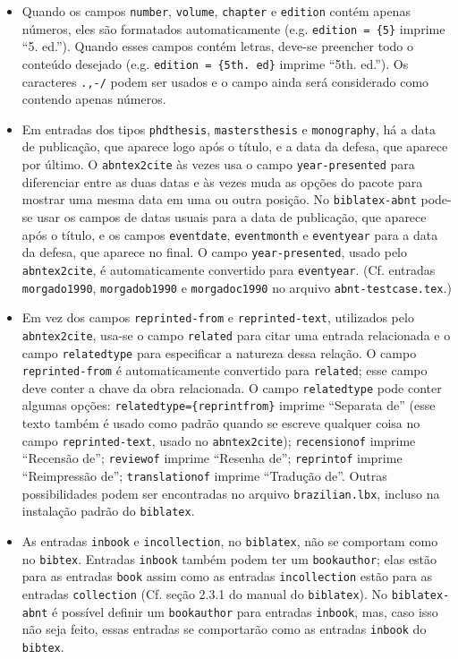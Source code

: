 \documentclass[a4paper]{article}
\begin{document}
\begin{itemize}
    \item Quando os campos \verb`number`, \verb`volume`, \verb`chapter` e \verb`edition` contém apenas números, eles são formatados automaticamente (e.g. \verb`edition = {5}` imprime ``5. ed.''). Quando esses campos contém letras, deve-se preencher todo o conteúdo desejado (e.g. \verb`edition = {5th. ed}` imprime ``5th. ed.''). Os caracteres \verb`.,-/` podem ser usados e o campo ainda será considerado como contendo apenas números.
    \item Em entradas dos tipos \verb`phdthesis`, \verb`mastersthesis` e \verb`monography`, há a data de publicação, que aparece logo após o título, e a data da defesa, que aparece por último. O \verb`abntex2cite` às vezes usa o campo \verb`year-presented` para diferenciar entre as duas datas e às vezes muda as opções do pacote para mostrar uma mesma data em uma ou outra posição. No \verb`biblatex-abnt` pode-se usar os campos de datas usuais para a data de publicação, que aparece após o título, e os campos \verb`eventdate`, \verb`eventmonth` e \verb`eventyear` para a data da defesa, que aparece no final. O campo \verb`year-presented`, usado pelo \verb`abntex2cite`, é automaticamente convertido para \verb`eventyear`. (Cf. entradas \verb`morgado1990`, \verb`morgadob1990` e \verb`morgadoc1990` no arquivo \verb`abnt-testcase.tex`.)
    \item Em vez dos campos \verb`reprinted-from` e \verb`reprinted-text`, utilizados pelo \verb`abntex2cite`, usa-se o campo \verb`related` para citar uma entrada relacionada e o campo \verb`relatedtype` para especificar a natureza dessa relação. O campo \verb`reprinted-from` é automaticamente convertido para \verb`related`; esse campo deve conter a chave da obra relacionada. O campo \verb`relatedtype` pode conter algumas opções: \verb`relatedtype={reprintfrom}` imprime ``Separata de'' (esse texto também é usado como padrão quando se escreve qualquer coisa no campo \verb`reprinted-text`, usado no \verb`abntex2cite`); \verb`recensionof` imprime ``Recensão de''; \verb`reviewof` imprime ``Resenha de''; \verb`reprintof` imprime ``Reimpressão de''; \verb`translationof` imprime ``Tradução de''. Outras possibilidades podem ser encontradas no arquivo \verb`brazilian.lbx`, incluso na instalação padrão do \verb`biblatex`.
    \item As entradas \verb`inbook` e \verb`incollection`, no \verb`biblatex`, não se comportam como no \verb`bibtex`. Entradas \verb`inbook` também podem ter um \verb`bookauthor`; elas estão para as entradas \verb`book` assim como as entradas \verb`incollection` estão para as entradas \verb`collection` (Cf. seção 2.3.1 do manual do \verb`biblatex`). No \verb`biblatex-abnt` é possível definir um \verb`bookauthor` para entradas \verb`inbook`, mas, caso isso não seja feito, essas entradas se comportarão como as entradas \verb`inbook` do \verb`bibtex`.

\end{itemize}
\end{document}
